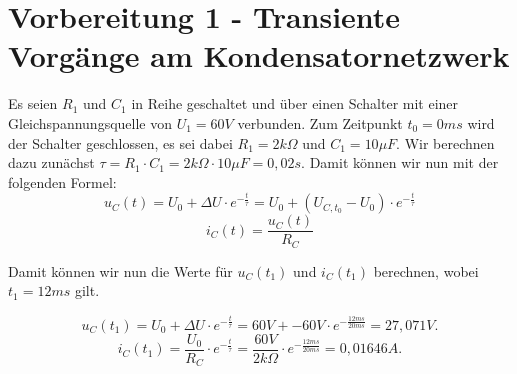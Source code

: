 \documentclass{article}
\begin{document}
\newpage
\thispagestyle{empty}

\tableofcontents


\newpage

\section{Vorbereitung 1 - Transiente Vorgänge am Kondensatornetzwerk}

Es seien $R_{1}$ und $C_{1}$ in Reihe geschaltet und über einen Schalter mit einer Gleichspannungsquelle von $U_{1} = 60V$ verbunden. Zum Zeitpunkt $t_{0} = 0ms$ wird der Schalter geschlossen, es sei dabei $R_{1} = 2k\Omega$ und $C_{1} = 10\mu F$.
Wir berechnen dazu zunächst $\tau = R_{1} \cdot C_{1} = 2k\Omega \cdot 10\mu F = 0,02 s$. Damit können wir nun mit der folgenden Formel:
\begin{equation}
  \label{eq:1}
  u_{C}(t) = U_{0} + \Delta U \cdot e^{-\frac{t}{\tau}} = U_{0} + (U_{C,t_{0}} - U_{0})\cdot e^{-\frac{t}{\tau}}
\end{equation}
\begin{equation}
  \label{eq:2}
  i_{C}(t) = \frac{u_{C}(t)}{R_{C}}
\end{equation}

Damit können wir nun die Werte für $u_{C}(t_{1})$ und $i_{C}(t_{1})$ berechnen, wobei $t_{1} = 12ms$ gilt.

\begin{equation*}
  u_{C}(t_{1}) = U_{0}+\Delta U \cdot e^{-\frac{t}{\tau}} = 60V + -60V \cdot e^{-\frac{12ms}{20ms}} = 27,071V.
\end{equation*}
\begin{equation*}
  i_{C}(t_{1}) = \frac{U_{0}}{R_{C}} \cdot e^{-\frac{t}{\tau}} = \frac{60V}{2k\Omega} \cdot e^{-\frac{12ms}{20ms}} = 0,01646A.
\end{equation*}
\end{document}
